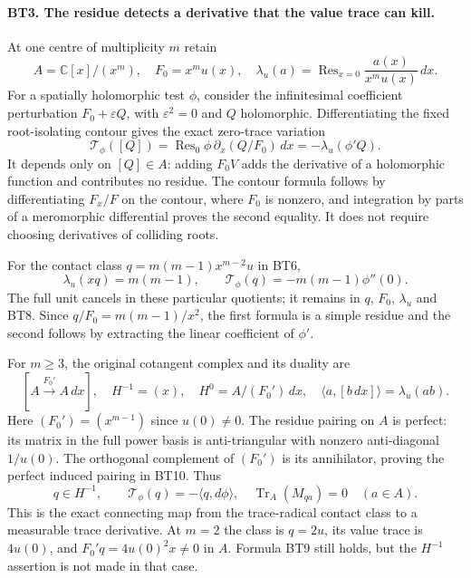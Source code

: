 \paragraph{BT3. The residue detects a derivative that the value trace can kill.}
At one centre of multiplicity $m$ retain
\[
 A=\mathbb C[x]/(x^m),\quad F_0=x^mu(x),\quad
 \lambda_u(a)=\operatorname{Res}_{x=0}\frac{a(x)}{x^mu(x)}\,dx.
 \tag{BT7}
\]
For a spatially holomorphic test $\phi$, consider the infinitesimal
coefficient perturbation $F_0+\varepsilon Q$, with
$\varepsilon^2=0$ and $Q$ holomorphic. Differentiating the fixed
root-isolating contour gives the exact zero-trace variation
\[
 \mathcal T_\phi([Q])
  =\operatorname{Res}_{0}\phi\,\partial_x(Q/F_0)\,dx
  =-\lambda_u(\phi'Q).
 \tag{BT8}
\]
It depends only on $[Q]\in A$: adding $F_0V$ adds the derivative
of a holomorphic function and contributes no residue. The contour
formula follows by differentiating $F_x/F$ on the contour, where
$F_0$ is nonzero, and integration by parts of a meromorphic
differential proves the second equality. It does not require
choosing derivatives of colliding roots.

For the contact class $q=m(m-1)x^{m-2}u$ in BT6,
\[
 \boxed{\lambda_u(xq)=m(m-1),\qquad
        \mathcal T_\phi(q)=-m(m-1)\phi''(0).}
 \tag{BT9}
\]
The full unit cancels in these particular quotients; it remains
in $q$, $F_0$, $\lambda_u$ and BT8. Since $q/F_0=m(m-1)/x^2$,
the first formula is a simple residue and the second follows by
extracting the linear coefficient of $\phi'$.

For $m\ge3$, the original cotangent complex and its duality are
\[
 [A\xrightarrow{F_0'}A\,dx],\quad
 H^{-1}=(x),\quad H^0=A/(F_0')\,dx,
 \quad\langle a,[b\,dx]\rangle=\lambda_u(ab).
 \tag{BT10}
\]
Here $(F_0')=(x^{m-1})$ since $u(0)\ne0$. The residue pairing
on $A$ is perfect: its matrix in the full power basis is
anti-triangular with nonzero anti-diagonal $1/u(0)$. The
orthogonal complement of $(F_0')$ is its annihilator, proving
the perfect induced pairing in BT10. Thus
\[
 q\in H^{-1},\qquad
 \mathcal T_\phi(q)=-\langle q,d\phi\rangle,
 \quad\operatorname{Tr}_A(M_{qa})=0\quad(a\in A).
 \tag{BT11}
\]
This is the exact connecting map from the trace-radical contact
class to a measurable trace derivative. At $m=2$ the class is
$q=2u$, its value trace is $4u(0)$, and
$F_0'q=4u(0)^2x\ne0$ in $A$. Formula BT9 still holds, but
the $H^{-1}$ assertion is not made in that case.

